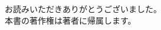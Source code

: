 \newpage
\thispagestyle{empty}
\begin{center}
  \vspace*{\fill}
  {\Large お読みいただきありがとうございました。} \\[1cm]
  {\small 本書の著作権は著者に帰属します。}
  \vspace*{\fill}
\end{center}
